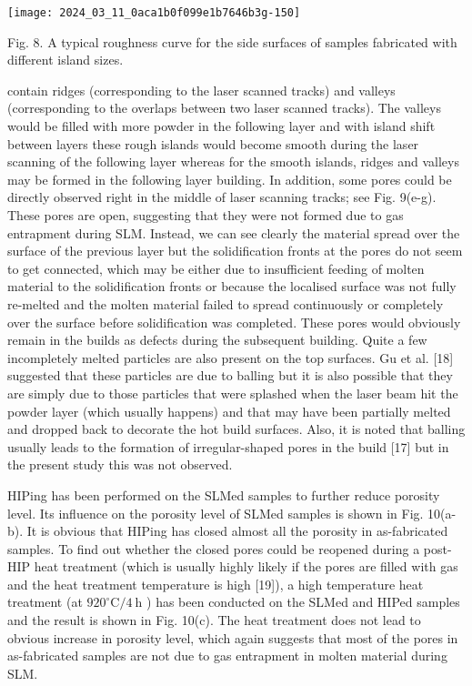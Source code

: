 \documentclass[10pt]{article}
\begin{document}
\begin{center}
\texttt{[image: 2024\_03\_11\_0aca1b0f099e1b7646b3g-150]}
\end{center}

Fig. 8. A typical roughness curve for the side surfaces of samples fabricated with different island sizes.

contain ridges (corresponding to the laser scanned tracks) and valleys (corresponding to the overlaps between two laser scanned tracks). The valleys would be filled with more powder in the following layer and with island shift between layers these rough islands would become smooth during the laser scanning of the following layer whereas for the smooth islands, ridges and valleys may be formed in the following layer building. In addition, some pores could be directly observed right in the middle of laser scanning tracks; see Fig. 9(e-g). These pores are open, suggesting that they were not formed due to gas entrapment during SLM. Instead, we can see clearly the material spread over the surface of the previous layer but the solidification fronts at the pores do not seem to get connected, which may be either due to insufficient feeding of molten material to the solidification fronts or because the localised surface was not fully re-melted and the molten material failed to spread continuously or completely over the surface before solidification was completed. These pores would obviously remain in the builds as defects during the subsequent building. Quite a few incompletely melted particles are also present on the top surfaces. Gu et al. [18] suggested that these particles are due to balling but it is also possible that they are simply due to those particles that were splashed when the laser beam hit the powder layer (which usually happens) and that may have been partially melted and dropped back to decorate the hot build surfaces. Also, it is noted that balling usually leads to the formation of irregular-shaped pores in the build [17] but in the present study this was not observed.

HIPing has been performed on the SLMed samples to further reduce porosity level. Its influence on the porosity level of SLMed samples is shown in Fig. 10(a-b). It is obvious that HIPing has closed almost all the porosity in as-fabricated samples. To find out whether the closed pores could be reopened during a post-HIP heat treatment (which is usually highly likely if the pores are filled with gas and the heat treatment temperature is high [19]), a high temperature heat treatment (at $920^{\circ} \mathrm{C} / 4 \mathrm{~h}$ ) has been conducted on the SLMed and HIPed samples and the result is shown in Fig. 10(c). The heat treatment does not lead to obvious increase in porosity level, which again suggests that most of the pores in as-fabricated samples are not due to gas entrapment in molten material during SLM.
\end{document}
